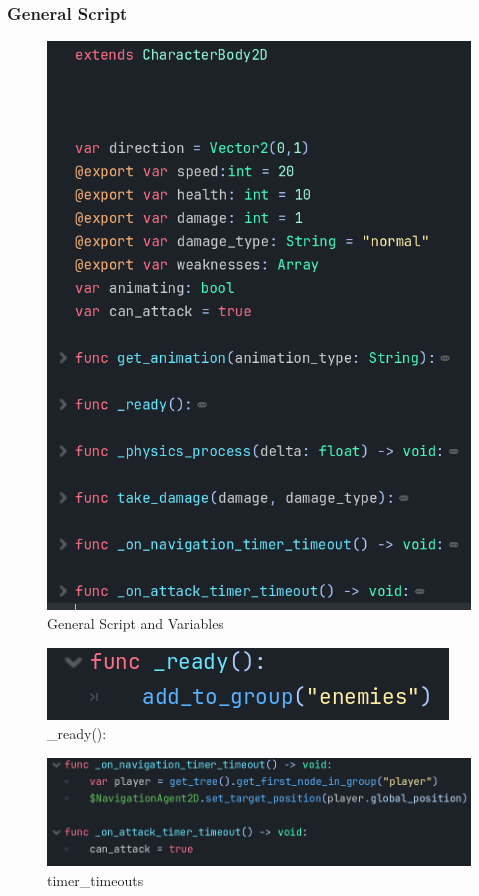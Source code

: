 \documentclass{article}
\begin{document}
        \subsubsection{General Script}
        \begin{multicols}{2}
                \begin{figure}[H]
                        \centering
                        \includegraphics[width = 0.8\columnwidth]{images/development/Enemy_script.PNG}
                        \caption{General Script and Variables}
                \end{figure}
                \begin{figure}[H]
                        \centering
                        \includegraphics[width = 0.9\columnwidth]{images/development/Enemy_ready.PNG}
                        \caption{\_ready():}
                \end{figure}   
                \begin{figure}[H]
                        \centering
                        \includegraphics[width = 0.9\columnwidth]{images/development/Enemy_timer_timeouts.PNG}
                        \caption{timer\_timeouts}
                \end{figure}
        \end{multicols}
\end{document}
